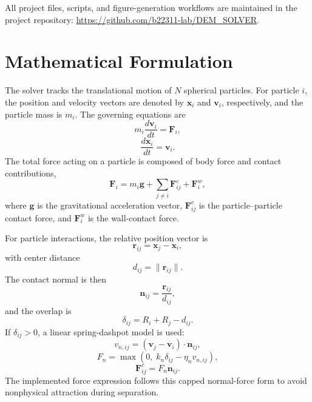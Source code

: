 \documentclass[conference]{IEEEtran}
\newcommand{\projectrepo}{\url{https://github.com/b22311-lab/DEM_SOLVER}}
\begin{document}
All project files, scripts, and figure-generation workflows are maintained in the project repository: \projectrepo.

\section{Mathematical Formulation}
The solver tracks the translational motion of $N$ spherical particles. For particle $i$, the position and velocity vectors are denoted by $\mathbf{x}_i$ and $\mathbf{v}_i$, respectively, and the particle mass is $m_i$. The governing equations are
\begin{equation}
    m_i \frac{d \mathbf{v}_i}{dt} = \mathbf{F}_i,
\end{equation}
\begin{equation}
    \frac{d \mathbf{x}_i}{dt} = \mathbf{v}_i.
\end{equation}
The total force acting on a particle is composed of body force and contact contributions,
\begin{equation}
    \mathbf{F}_i = m_i \mathbf{g} + \sum_{j \ne i} \mathbf{F}^{c}_{ij} + \mathbf{F}^{w}_i,
\end{equation}
where $\mathbf{g}$ is the gravitational acceleration vector, $\mathbf{F}^{c}_{ij}$ is the particle--particle contact force, and $\mathbf{F}^{w}_i$ is the wall-contact force.

For particle interactions, the relative position vector is
\begin{equation}
    \mathbf{r}_{ij} = \mathbf{x}_j - \mathbf{x}_i,
\end{equation}
with center distance
\begin{equation}
    d_{ij} = \lVert \mathbf{r}_{ij} \rVert.
\end{equation}
The contact normal is then
\begin{equation}
    \mathbf{n}_{ij} = \frac{\mathbf{r}_{ij}}{d_{ij}},
\end{equation}
and the overlap is
\begin{equation}
    \delta_{ij} = R_i + R_j - d_{ij}.
\end{equation}
If $\delta_{ij} > 0$, a linear spring-dashpot model is used:
\begin{equation}
    v_{n,ij} = (\mathbf{v}_j - \mathbf{v}_i) \cdot \mathbf{n}_{ij},
\end{equation}
\begin{equation}
    F_n = \max \left(0,\; k_n \delta_{ij} - \eta_n v_{n,ij} \right),
\end{equation}
\begin{equation}
    \mathbf{F}^{c}_{ij} = F_n \mathbf{n}_{ij}.
\end{equation}
The implemented force expression follows this capped normal-force form to avoid nonphysical attraction during separation.
\end{document}
